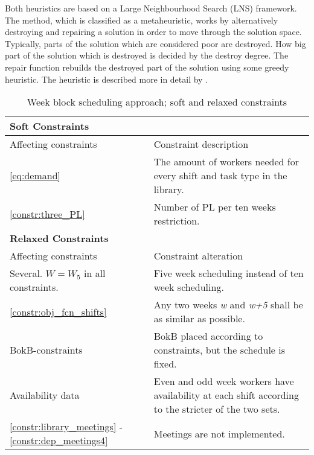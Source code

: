 Both heuristics are based on a Large Neighbourhood Search (LNS) framework. The method, which is classified as a metaheuristic, works by alternatively destroying and repairing a solution in order to move through the solution space. Typically, parts of the solution which are considered poor are destroyed. How big part of the solution which is destroyed is decided by the destroy degree. The repair function rebuilds the destroyed part of the solution using some greedy heuristic. The heuristic is described more in detail by \citet{pisinger_2010}.

\begin{table}[!h]
\centering
\caption{Week block scheduling approach; soft and relaxed constraints}
\label{tab:weekly_task_constraints}
\begin{tabular}{|p{4cm}|p{7cm}|}
\hline
\multicolumn{2}{|l|}{\cellcolor{gray!90} \textbf{Soft Constraints}} \\
\hline 
\rowcolor{Gray} Affecting constraints & Constraint description \\ \hline
\ref{eq:demand} & The amount of workers needed for every shift and task type in the library.  \\ \hline
\ref{constr:three_PL} & Number of PL per ten weeks restriction. \\ \hline
\multicolumn{2}{|l|}{\cellcolor{gray!90} \textbf{Relaxed Constraints}} \\
\hline 
\rowcolor{Gray} Affecting constraints & Constraint alteration \\ \hline
Several. $W = W_5$ in all constraints. & Five week scheduling instead of ten week scheduling. \\ \hline
\ref{constr:obj_fcn_shifts} & Any two weeks \textit{w} and \textit{w+5} shall be as similar as possible. \\ \hline
BokB-constraints & BokB placed according to constraints, but the schedule is fixed. \\ \hline
Availability data & Even and odd week workers have availability at each shift according to the stricter of the two sets. \\ \hline
\ref{constr:library_meetings} - \ref{constr:dep_meetings4} & Meetings are not implemented. \\ \hline
\end{tabular}
\end{table}


